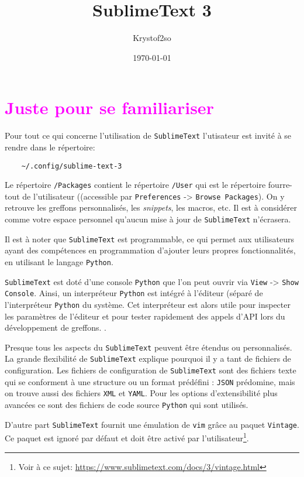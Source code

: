 \documentclass[french,a4paper]{article}
\title{SublimeText 3}
\author{Krystof2so}
\date{\today}
\begin{document}
\maketitle

\section{\textcolor{magenta}{Juste pour se familiariser}}
Pour tout ce qui concerne l'utilisation de \texttt{SublimeText} l'utisateur
 est invité à se rendre dans le répertoire:
\begin{verbatim}
    ~/.config/sublime-text-3
\end{verbatim}
\medskip

Le répertoire \verb|/Packages| contient le répertoire \verb|/User| qui est le
 répertoire fourre-tout de l'utilisateur ((accessible par \texttt{Preferences}
 -> \texttt{Browse Packages}). On y retrouve les greffons personnalisés, les
 \textit{snippets}, les macros, etc. Il est à considérer comme votre espace 
 personnel qu'aucun mise à jour de \texttt{SublimeText} n'écrasera.
\medskip

Il est à noter que \texttt{SublimeText} est programmable, ce qui permet aux
utilisateurs ayant des compétences en programmation d'ajouter leurs propres
fonctionnalités, en utilisant le langage \texttt{Python}.
\medskip

\texttt{SublimeText} est doté d'une console \texttt{Python} que l'on peut
 ouvrir via \texttt{View} -> \texttt{Show Console}. Ainsi, un interpréteur
 \texttt{Python} est intégré à l'éditeur (séparé de l'interpréteur 
 \texttt{Python} du système. Cet interpréteur est alors utile pour inspecter
 les paramètres de l'éditeur et pour tester rapidement des appels d'API lors du
 développement de greffons. 
.
\medskip

Presque tous les aspects du \texttt{SublimeText} peuvent être étendus ou
 personnalisés. La grande flexibilité de \texttt{SublimeText} explique pourquoi
 il y a tant de fichiers de configuration. Les fichiers de configuration de 
 \texttt{SublimeText} sont des fichiers texte qui se conforment à une structure
 ou un format prédéfini : \texttt{JSON} prédomine, mais on trouve aussi des 
 fichiers \texttt{XML} et \texttt{YAML}. Pour les options d'extensibilité plus
 avancées ce sont des fichiers de code source \texttt{Python} qui sont 
 utilisés.
\medskip

D'autre part \texttt{SublimeText} fournit une émulation de \texttt{vim} grâce 
 au paquet \texttt{Vintage}. Ce paquet est ignoré par défaut et doit être 
 activé par l'utilisateur\footnote{Voir à ce sujet: 
 \url{https://www.sublimetext.com/docs/3/vintage.html}}.
\bigskip
\end{document}
